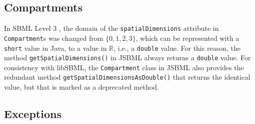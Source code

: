 \subsection{Compartments}

In SBML Level 3
%
\citep{Hucka2010a}, the domain of the \texttt{spatialDimensions} attribute in
\texttt{Compartment}s was changed from $\lbrace 0, 1, 2, 3\rbrace$, which can be
represented with a \texttt{short} value in Java, to a value in $\mathbb{R}$,
i.e., a \texttt{double} value. For this reason, the method
\texttt{getSpatialDimensions()} in JSBML
always returns a \texttt{double} value. For consistency with libSBML, the
\texttt{Compartment} class in JSBML also provides the redundant method
\texttt{getSpatialDimensionsAsDouble()} that returns the identical value, but
that is marked as a deprecated method.
%
%
%


\subsection{Exceptions}

